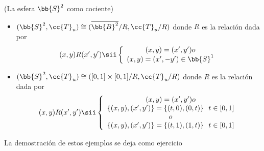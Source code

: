  \begin{ejemplo}(La esfera $\bb{S}^2$ como cociente)
    
    \begin{itemize}
        \item $(\bb{S}^2, \cc{T}_u)\cong (\overline{\bb{B}^2}/R, \cc{T}_u/R)$ donde $R$ es la relación dada por 
        \begin{align*}
            (x,y)R(x',y') \sii \left\{
                \begin{array}{c}
                    (x,y)=(x',y')
                    o\\
                    (x,y)=(x',-y')\in \bb{S}^1
                \end{array}
                \right.
        \end{align*}

        \item  $(\bb{S}^2, \cc{T}_u)\cong ([0,1]\times [0,1] /R, \cc{T}_u/R)$ donde $R$ es la relación dada por 
        \begin{align*}
            (x,y)R(x',y') \sii \left\{
                \begin{array}{c}
                    (x,y)=(x',y')
                    o\\
                    \{(x,y),(x',y')\}=\{(t,0),(0,t)\}\ \ t\in [0,1]\\
                    o\\
                    \{(x,y),(x',y')\}=\{(t,1),(1,t)\}\ \ t\in [0,1]\\
                \end{array}
                \right.
        \end{align*}
        
    \end{itemize}
    La demostración de estos ejemplos se deja como ejercicio
    \endsquare
 \end{ejemplo}